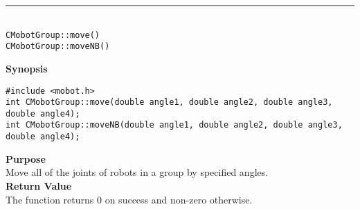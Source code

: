\noindent
\vspace{5pt}
\rule{4.5in}{0.015in}\\
\noindent
{\LARGE \texttt{CMobotGroup::move()}}\\
{\LARGE \texttt{CMobotGroup::moveNB()}}\\
{}

\noindent
{\bf Synopsis}
\vspace{-8pt}
\begin{verbatim}
#include <mobot.h>
int CMobotGroup::move(double angle1, double angle2, double angle3, double angle4);
int CMobotGroup::moveNB(double angle1, double angle2, double angle3, double angle4);
\end{verbatim}

\noindent
{\bf Purpose}\\
Move all of the joints of robots in a group by specified angles.\\

\noindent
{\bf Return Value}\\
The function returns 0 on success and non-zero otherwise.\\


